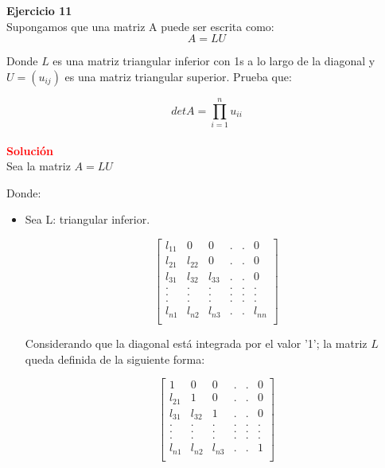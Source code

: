 \documentclass[12pt]{article}
\begin{document}
\noindent \textbf{Ejercicio 11}\\
Supongamos que una matriz A puede ser escrita como:
    \[A = LU\]

Donde $L$ es una matriz triangular inferior con 1s a lo largo de la diagonal y $U = (u_{ij})$ es una matriz triangular superior. Prueba que:

    \[det A = \prod_{i=1}^n u_{ii}\]\\

\noindent \textcolor{red}{\bf Solución}\\
Sea la matriz $A = LU$

Donde: 
\begin{itemize}
    \item Sea L: triangular inferior.
    
            \[\left[\begin{array}{ccccccc}
                 l_{11} & 0      & 0        & . & . & 0     \\
                 l_{21} & l_{22} & 0        & . & . & 0     \\
                 l_{31} & l_{32} & l_{33}   & . & . & 0     \\
                    .   &   .    & .        & . & . & .     \\
                    .   &   .    & .        & . & . & .     \\
                    .   &   .    & .        & . & . & .     \\
                 l_{n1} & l_{n2} & l_{n3}   & . & . & l_{nn}\\
            \end{array}\right]\]
            
            Considerando que la diagonal está integrada por el valor '1'; la matriz $L$ queda definida de la siguiente forma:
            
            \[\left[\begin{array}{ccccccc}
                 1      & 0      & 0        & . & . & 0 \\
                 l_{21} & 1      & 0        & . & . & 0 \\
                 l_{31} & l_{32} & 1        & . & . & 0 \\
                    .   &   .    & .        & . & . & . \\
                    .   &   .    & .        & . & . & . \\
                    .   &   .    & .        & . & . & . \\
                 l_{n1} & l_{n2} & l_{n3}   & . & . & 1 \\
            \end{array}\right]\]
    

\end{itemize}
\end{document}
